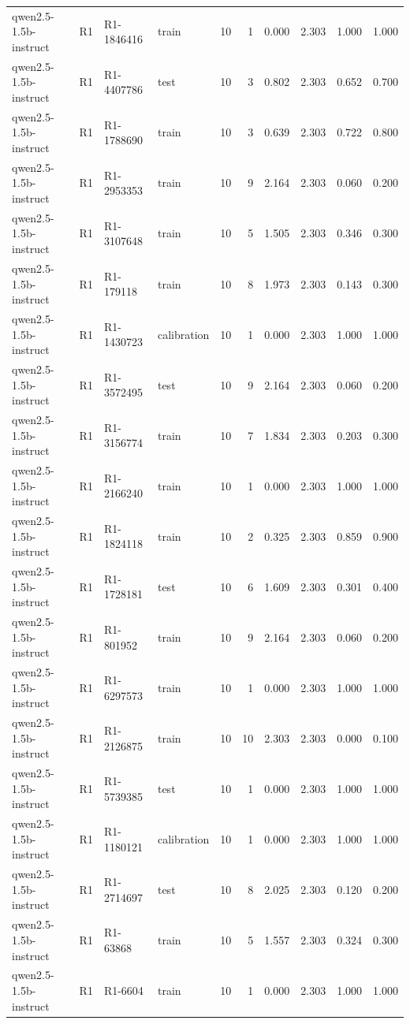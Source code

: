 \begin{table}
\begin{tabular}{llllrrrrrr}
qwen2.5-1.5b-instruct & R1 & R1-1846416 & train & 10 & 1 & 0.000 & 2.303 & 1.000 & 1.000 \\
qwen2.5-1.5b-instruct & R1 & R1-4407786 & test & 10 & 3 & 0.802 & 2.303 & 0.652 & 0.700 \\
qwen2.5-1.5b-instruct & R1 & R1-1788690 & train & 10 & 3 & 0.639 & 2.303 & 0.722 & 0.800 \\
qwen2.5-1.5b-instruct & R1 & R1-2953353 & train & 10 & 9 & 2.164 & 2.303 & 0.060 & 0.200 \\
qwen2.5-1.5b-instruct & R1 & R1-3107648 & train & 10 & 5 & 1.505 & 2.303 & 0.346 & 0.300 \\
qwen2.5-1.5b-instruct & R1 & R1-179118 & train & 10 & 8 & 1.973 & 2.303 & 0.143 & 0.300 \\
qwen2.5-1.5b-instruct & R1 & R1-1430723 & calibration & 10 & 1 & 0.000 & 2.303 & 1.000 & 1.000 \\
qwen2.5-1.5b-instruct & R1 & R1-3572495 & test & 10 & 9 & 2.164 & 2.303 & 0.060 & 0.200 \\
qwen2.5-1.5b-instruct & R1 & R1-3156774 & train & 10 & 7 & 1.834 & 2.303 & 0.203 & 0.300 \\
qwen2.5-1.5b-instruct & R1 & R1-2166240 & train & 10 & 1 & 0.000 & 2.303 & 1.000 & 1.000 \\
qwen2.5-1.5b-instruct & R1 & R1-1824118 & train & 10 & 2 & 0.325 & 2.303 & 0.859 & 0.900 \\
qwen2.5-1.5b-instruct & R1 & R1-1728181 & test & 10 & 6 & 1.609 & 2.303 & 0.301 & 0.400 \\
qwen2.5-1.5b-instruct & R1 & R1-801952 & train & 10 & 9 & 2.164 & 2.303 & 0.060 & 0.200 \\
qwen2.5-1.5b-instruct & R1 & R1-6297573 & train & 10 & 1 & 0.000 & 2.303 & 1.000 & 1.000 \\
qwen2.5-1.5b-instruct & R1 & R1-2126875 & train & 10 & 10 & 2.303 & 2.303 & 0.000 & 0.100 \\
qwen2.5-1.5b-instruct & R1 & R1-5739385 & test & 10 & 1 & 0.000 & 2.303 & 1.000 & 1.000 \\
qwen2.5-1.5b-instruct & R1 & R1-1180121 & calibration & 10 & 1 & 0.000 & 2.303 & 1.000 & 1.000 \\
qwen2.5-1.5b-instruct & R1 & R1-2714697 & test & 10 & 8 & 2.025 & 2.303 & 0.120 & 0.200 \\
qwen2.5-1.5b-instruct & R1 & R1-63868 & train & 10 & 5 & 1.557 & 2.303 & 0.324 & 0.300 \\
qwen2.5-1.5b-instruct & R1 & R1-6604 & train & 10 & 1 & 0.000 & 2.303 & 1.000 & 1.000 \\

\end{tabular}
\end{table}
